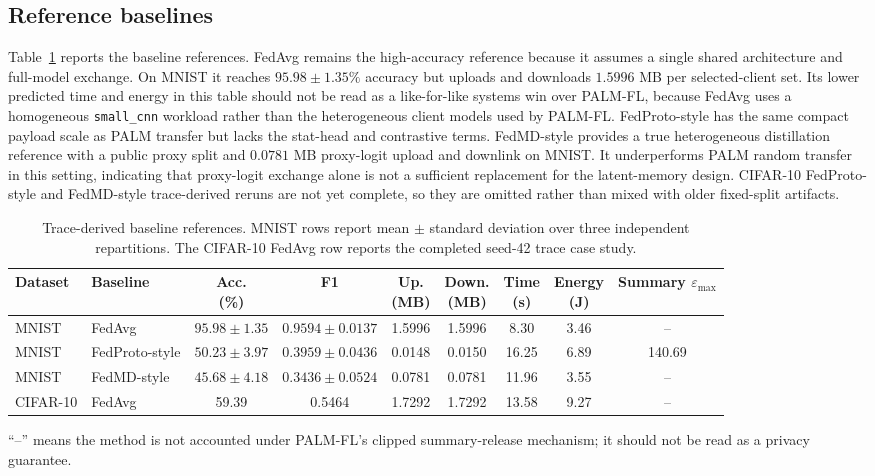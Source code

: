 \documentclass[10pt,journal]{IEEEtran}
\begin{document}
\subsection{Reference baselines}
Table~\ref{tab:baseline_reference} reports the baseline references. FedAvg remains the high-accuracy reference because it assumes a single shared architecture and full-model exchange. On MNIST it reaches $95.98\pm1.35\%$ accuracy but uploads and downloads $1.5996$ MB per selected-client set. Its lower predicted time and energy in this table should not be read as a like-for-like systems win over PALM-FL, because FedAvg uses a homogeneous \texttt{small\_cnn} workload rather than the heterogeneous client models used by PALM-FL. FedProto-style has the same compact payload scale as PALM transfer but lacks the stat-head and contrastive terms. FedMD-style provides a true heterogeneous distillation reference with a public proxy split and $0.0781$ MB proxy-logit upload and downlink on MNIST. It underperforms PALM random transfer in this setting, indicating that proxy-logit exchange alone is not a sufficient replacement for the latent-memory design. CIFAR-10 FedProto-style and FedMD-style trace-derived reruns are not yet complete, so they are omitted rather than mixed with older fixed-split artifacts.

\begin{table}[t]
\centering
\caption{Trace-derived baseline references. MNIST rows report mean $\pm$ standard deviation over three independent repartitions. The CIFAR-10 FedAvg row reports the completed seed-42 trace case study.}
\label{tab:baseline_reference}
\begin{threeparttable}
\setlength{\tabcolsep}{3pt}
\scriptsize
\begin{tabular}{llccccccc}
\toprule
Dataset & Baseline & \makecell{Acc.\\(\%)} & F1 & \makecell{Up.\\(MB)} & \makecell{Down.\\(MB)} & \makecell{Time\\(s)} & \makecell{Energy\\(J)} & \makecell{Summary\\$\varepsilon_{\max}$} \\
\midrule
MNIST & FedAvg & $95.98{\pm}1.35$ & $0.9594{\pm}0.0137$ & 1.5996 & 1.5996 & 8.30 & 3.46 & -- \\
MNIST & FedProto-style & $50.23{\pm}3.97$ & $0.3959{\pm}0.0436$ & 0.0148 & 0.0150 & 16.25 & 6.89 & 140.69 \\
MNIST & FedMD-style & $45.68{\pm}4.18$ & $0.3436{\pm}0.0524$ & 0.0781 & 0.0781 & 11.96 & 3.55 & -- \\
CIFAR-10 & FedAvg & 59.39 & 0.5464 & 1.7292 & 1.7292 & 13.58 & 9.27 & -- \\
\bottomrule
\end{tabular}
\begin{tablenotes}[flushleft]
\footnotesize
\item ``--'' means the method is not accounted under PALM-FL's clipped summary-release mechanism; it should not be read as a privacy guarantee.
\end{tablenotes}
\end{threeparttable}
\end{table}
\end{document}
